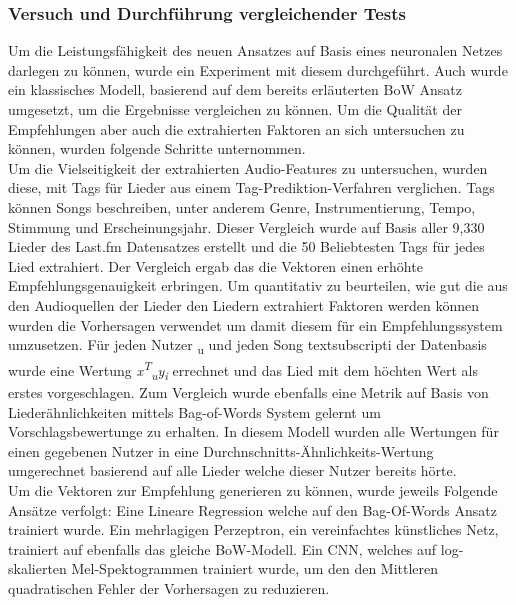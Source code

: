 \documentclass[twosided,a4,10pt]{article}
\begin{document}
\begin{multicols}{2}
		\subsubsection{Versuch und Durchführung vergleichender Tests}
		Um die Leistungsfähigkeit des neuen Ansatzes auf Basis eines neuronalen Netzes darlegen zu können, wurde ein Experiment mit diesem durchgeführt. Auch wurde ein klassisches Modell, basierend auf dem bereits erläuterten BoW Ansatz umgesetzt, um die Ergebnisse vergleichen zu können. Um die Qualität der Empfehlungen aber auch die extrahierten Faktoren an sich untersuchen zu können, wurden folgende Schritte unternommen.\newline\\
		Um die Vielseitigkeit der extrahierten Audio-Features zu untersuchen, wurden diese, mit Tags für Lieder aus einem Tag-Prediktion-Verfahren verglichen. Tags können Songs beschreiben, unter anderem Genre, Instrumentierung, Tempo, Stimmung und Erscheinungsjahr. Dieser Vergleich wurde auf Basis aller 9,330 Lieder des Last.fm Datensatzes erstellt und die 50 Beliebtesten Tags für jedes Lied extrahiert. Der Vergleich ergab das die Vektoren einen erhöhte Empfehlungsgenauigkeit erbringen.\newline
		Um quantitativ zu beurteilen, wie gut die aus den Audioquellen der Lieder den Liedern extrahiert Faktoren  werden können wurden die Vorhersagen verwendet um damit diesem für ein Empfehlungssystem umzusetzen. Für jeden Nutzer \textsubscript{u} und jeden Song textsubscript{i} der Datenbasis wurde eine Wertung \textit{x\textsuperscript{T}\textsubscript{u}}\textit{y\textsubscript{i}} errechnet und das Lied mit dem höchten Wert als erstes vorgeschlagen. Zum Vergleich wurde ebenfalls eine Metrik auf Basis von Liederähnlichkeiten mittels Bag-of-Words System gelernt um Vorschlagsbewertunge zu erhalten. In diesem Modell wurden alle Wertungen für einen gegebenen Nutzer in eine Durchnschnitts-Ähnlichkeits-Wertung umgerechnet basierend auf alle Lieder welche dieser Nutzer bereits hörte.\newline\\
		Um die Vektoren zur Empfehlung generieren zu können, wurde jeweils Folgende Ansätze verfolgt:
		Eine Lineare Regression welche auf den Bag-Of-Words Ansatz trainiert wurde.
		Ein mehrlagigen Perzeptron, ein vereinfachtes künstliches Netz,  trainiert auf ebenfalls das gleiche BoW-Modell. \cite{perceptron}
		Ein CNN, welches auf log-skalierten Mel-Spektogrammen trainiert wurde, um den den Mittleren quadratischen Fehler der Vorhersagen zu reduzieren. 

\end{multicols}
\end{document}
